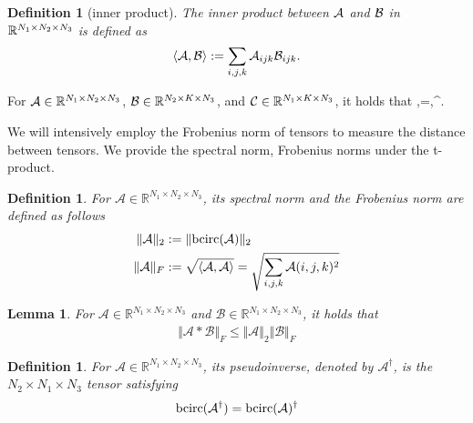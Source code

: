 \documentclass[11pt]{article}
\newtheorem{definition}[theorem]{Definition}
\newtheorem{lemma}[theorem]{Lemma}
\def\fm#1{\mathcal{#1}}
\def\r{\mathbb{R}}
\begin{document}
\begin{definition}[inner product]
The inner product between $\mathcal A$ and $\mathcal B$ in $\mathbb R^{N_1\times N_2\times N_3}$ is defined as $$\langle\mathcal A,\mathcal B\rangle:=\sum_{i,j,k}\mathcal A_{ijk}\mathcal B_{ijk}.$$ 
\end{definition}

For $\mathcal A\in\mathbb R^{N_1\times N_2\times N_3}$, $\mathcal B\in\mathbb R^{N_2\times K\times N_3}$, and $\mathcal C\in\mathbb R^{N_1\times K\times N_3}$, it holds that \beq\label{tran}\la\mcala*\mcalb,\mcalc\ra=\la\mcalb,\mcala^\top*\mcalc\ra.\eeq

We will intensively employ the Frobenius norm of tensors to measure the distance between tensors. We  provide the spectral norm, Frobenius norms under the t-product.
\begin{definition}  For $\fm A \in \r^{N_1 \times N_2 \times N_3}$, its spectral norm and the Frobenius norm are defined as follows
\begin{align}
    \Vert \fm A \Vert_2 &  := \Vert \bcirc (\fm A ) \Vert_2\\
    \Vert \fm A \Vert_F &:= \sqrt{\langle \fm A , \fm A \rangle} = \sqrt{\sum_{i,j,k}\fm A(i,j,k)^2}
\end{align}
\end{definition}
\begin{lemma}
    For $\fm A\in \r^{N_1\times N_2 \times N_3}$ and $\fm B\in \r^{N_1\times N_2 \times N_3}$, it holds that 
    \begin{align}
        \Vert \fm A * \fm B \Vert_F\leq \Vert \fm A \Vert_2 \Vert \fm B \Vert_F
    \end{align}
\end{lemma}
\begin{definition} For $\fm A\in \r^{N_1\times N_2\times N_3}$, its pseudoinverse, denoted by $\fm A^\dagger$, is the $N_2\times N_1\times N_3$ tensor satisfying
\begin{align}
    \bcirc(\fm A^\dagger) = \bcirc(\fm A )^\dagger
\end{align}
\end{definition}
\end{document}
